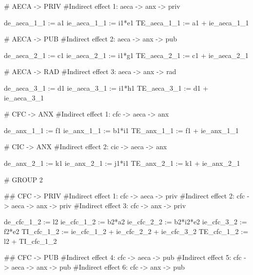 \documentclass[
  letterpaper,
  DIV=11,
  numbers=noendperiod]{scrreprt}
\newenvironment{Shaded}{\begin{snugshade}}{\end{snugshade}}
\newcommand{\StringTok}[1]{\textcolor[rgb]{0.13,0.47,0.30}{#1}}
\begin{document}
\begin{Shaded}
\begin{Highlighting}[]
\StringTok{\# AECA {-}\textgreater{} PRIV}
\StringTok{\#Indirect effect 1: aeca {-}\textgreater{} anx {-}\textgreater{} priv}

\StringTok{de\_aeca\_1\_1 := a1}
\StringTok{ie\_aeca\_1\_1 := i1*e1}
\StringTok{TE\_aeca\_1\_1 := a1 + ie\_aeca\_1\_1}

\StringTok{\# AECA {-}\textgreater{} PUB}
\StringTok{\#Indirect effect 2: aeca {-}\textgreater{} anx {-}\textgreater{} pub}

\StringTok{de\_aeca\_2\_1 := c1}
\StringTok{ie\_aeca\_2\_1 := i1*g1}
\StringTok{TE\_aeca\_2\_1 := c1 + ie\_aeca\_2\_1}

\StringTok{\# AECA {-}\textgreater{} RAD}
\StringTok{\#Indirect effect 3: aeca {-}\textgreater{} anx {-}\textgreater{} rad}

\StringTok{de\_aeca\_3\_1 := d1}
\StringTok{ie\_aeca\_3\_1 := i1*h1}
\StringTok{TE\_aeca\_3\_1 := d1 + ie\_aeca\_3\_1}


\StringTok{\# CFC {-}\textgreater{} ANX}
\StringTok{\#Indirect effect 1: cfc {-}\textgreater{} aeca {-}\textgreater{} anx}

\StringTok{de\_anx\_1\_1 := f1}
\StringTok{ie\_anx\_1\_1 := b1*i1}
\StringTok{TE\_anx\_1\_1 := f1 + ie\_anx\_1\_1}

\StringTok{\# CIC {-}\textgreater{} ANX}
\StringTok{\#Indirect effect 2: cic {-}\textgreater{} aeca {-}\textgreater{} anx}

\StringTok{de\_anx\_2\_1 := k1}
\StringTok{ie\_anx\_2\_1 := j1*i1}
\StringTok{TE\_anx\_2\_1 := k1 + ie\_anx\_2\_1}




\StringTok{\# GROUP 2}

\StringTok{\#\# CFC {-}\textgreater{} PRIV}
\StringTok{\#Indirect effect 1: cfc {-}\textgreater{} aeca {-}\textgreater{} priv}
\StringTok{\#Indirect effect 2: cfc {-}\textgreater{} aeca {-}\textgreater{} anx {-}\textgreater{} priv}
\StringTok{\#Indirect effect 3: cfc {-}\textgreater{} anx {-}\textgreater{} priv}

\StringTok{de\_cfc\_1\_2 := l2}
\StringTok{ie\_cfc\_1\_2 := b2*a2}
\StringTok{ie\_cfc\_2\_2 := b2*i2*e2}
\StringTok{ie\_cfc\_3\_2 := f2*e2}
\StringTok{TI\_cfc\_1\_2 := ie\_cfc\_1\_2 + ie\_cfc\_2\_2 + ie\_cfc\_3\_2}
\StringTok{TE\_cfc\_1\_2 := l2 + TI\_cfc\_1\_2}


\StringTok{\#\# CFC {-}\textgreater{} PUB}
\StringTok{\#Indirect effect 4: cfc {-}\textgreater{} aeca {-}\textgreater{} pub}
\StringTok{\#Indirect effect 5: cfc {-}\textgreater{} aeca {-}\textgreater{} anx {-}\textgreater{} pub}
\StringTok{\#Indirect effect 6: cfc {-}\textgreater{} anx {-}\textgreater{} pub}


\end{Highlighting}
\end{Shaded}
\end{document}
